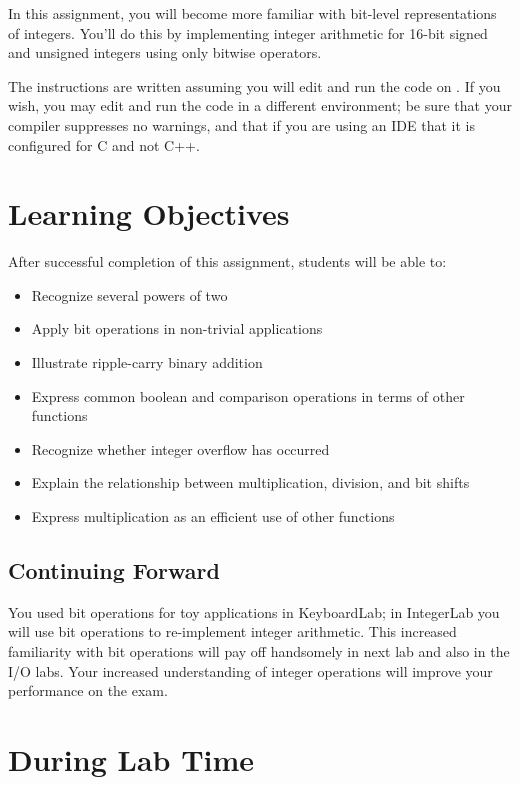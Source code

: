 In this assignment, you will become more familiar with bit-level representations of integers.
You'll do this by implementing integer arithmetic for 16-bit signed and unsigned integers using only bitwise operators.

The instructions are written assuming you will edit and run the code on \runtimeenvironment.
If you wish, you may edit and run the code in a different environment;
be sure that your compiler suppresses no warnings, and that if you are using an IDE that it is configured for C and not C++.

\section*{Learning Objectives}

After successful completion of this assignment, students will be able to:
\begin{itemize}
    \item Recognize several powers of two
    \item Apply bit operations in non-trivial applications
    \item Illustrate ripple-carry binary addition
    \item Express common boolean and comparison operations in terms of other functions
    \item Recognize whether integer overflow has occurred
    \item Explain the relationship between multiplication, division, and bit shifts
    \item Express multiplication as an efficient use of other functions
\end{itemize}

\subsection*{Continuing Forward}

You used bit operations for toy applications in KeyboardLab;
in IntegerLab you will use bit operations to re-implement integer arithmetic.
This increased familiarity with bit operations will pay off handsomely in next lab and also in the I/O labs.
Your increased understanding of integer operations will improve your performance on the exam.

\section*{During Lab Time}

